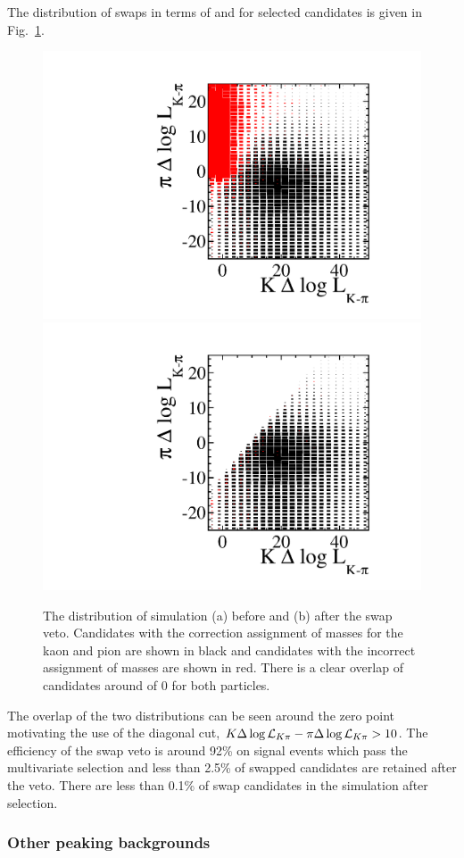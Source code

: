The distribution of \ktopi swaps in terms of \kdllkpi and \pidllkpi for selected \BdToKpimm candidates
is given in Fig.~\ref{fig:swave:meas:kpiswaps}. 
\begin{figure}[tbp]
\centering
\includegraphics[width=0.48\columnwidth]{chapter7/figs/kstarmumu_swap_2Ddist.pdf}
\includegraphics[width=0.48\columnwidth]{chapter7/figs/kstarmumu_swap_2Ddist_veto.pdf}
\caption[  The distribution of \BdToKpimm simulation (a) before and (b) after the \ktopi swap veto.   ]
{The distribution of \BdToKpimm simulation (a) before and (b) after the \ktopi swap veto. 
Candidates with the correction assignment of masses for the kaon and pion are shown in black and candidates 
with the incorrect assignment of masses are shown in red. There is a clear overlap of candidates around \dllkpi of 0 for both particles.
~\label{fig:swave:meas:kpiswaps} }
\end{figure}
The overlap of the two distributions can be seen around the zero point motivating the use of the diagonal cut, $K\Delta\log\mathcal{L}_{K\pi}-\pi\Delta\log\mathcal{L}_{K\pi}>10$.
The efficiency of the swap veto is around 92\% on signal events which pass the multivariate selection and 
less than 2.5\% of swapped candidates are retained after the veto.
There are less than 0.1\% of \ktopi swap candidates in the simulation after selection.

\subsubsection{Other peaking backgrounds}


